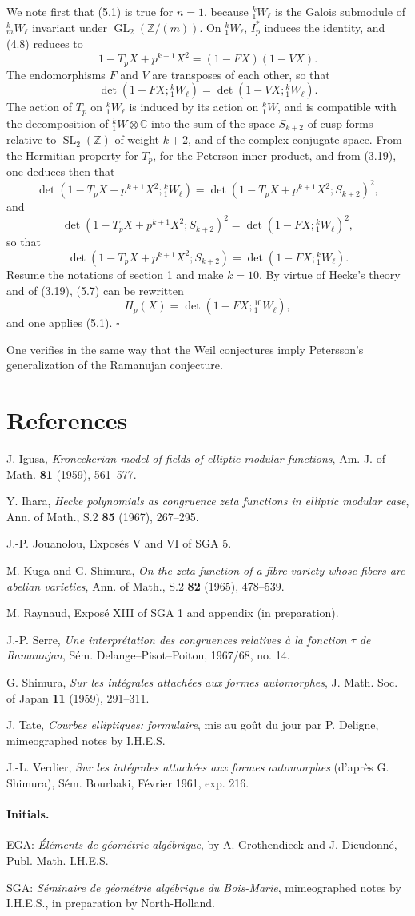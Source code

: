 \documentclass[10pt]{article}
\newcommand{\C}{\mathbb C}
\newcommand{\Z}{\mathbb Z}
\newcommand{\GL}{\operatorname{GL}}
\newcommand{\SL}{\operatorname{SL}}
\newcommand{\QED}{\hfill$\square$}
\begin{document}
We note first that (5.1) is true for $n=1$, because ${}^k_1W_\ell$ is the Galois submodule of ${}^k_mW_\ell$ invariant under $\GL_2(\Z/(m))$. On ${}^k_1W_\ell$, $I_p^*$ induces the identity, and (4.8) reduces to
\[
1-T_pX+p^{k+1}X^2=(1-FX)(1-VX).
\]
The endomorphisms $F$ and $V$ are transposes of each other, so that
\[
\det(1-FX;{}^k_1W_\ell)=\det(1-VX;{}^k_1W_\ell).
\]
The action of $T_p$ on ${}^k_1W_\ell$ is induced by its action on ${}^k_1W$, and is compatible with the decomposition of ${}^k_1W\otimes\C$ into the sum of the space $S_{k+2}$ of cusp forms relative to $\SL_2(\Z)$ of weight $k+2$, and of the complex conjugate space. From the Hermitian property for $T_p$, for the Peterson inner product, and from (3.19), one deduces then that
\[
\det(1-T_pX+p^{k+1}X^2;{}^k_1W_\ell)=\det(1-T_pX+p^{k+1}X^2;S_{k+2})^2,
\]
and
\[
\det(1-T_pX+p^{k+1}X^2;S_{k+2})^2=\det(1-FX;{}^k_1W_\ell)^2,
\]
so that
\[
\det(1-T_pX+p^{k+1}X^2;S_{k+2})=\det(1-FX;{}^k_1W_\ell).
\tag{5.7}
\]
Resume the notations of section 1 and make $k=10$. By virtue of Hecke's theory and of (3.19), (5.7) can be rewritten
\[
H_p(X)=\det(1-FX;{}^{10}_1W_\ell),
\]
and one applies (5.1). \QED

One verifies in the same way that the Weil conjectures imply Petersson's generalization of the Ramanujan conjecture.

\section*{References}
\begin{enumerate}[label={[\arabic*]},leftmargin=2.6em]
\item J. Igusa, \emph{Kroneckerian model of fields of elliptic modular functions}, Am. J. of Math. \textbf{81} (1959), 561--577.
\item Y. Ihara, \emph{Hecke polynomials as congruence zeta functions in elliptic modular case}, Ann. of Math., S.2 \textbf{85} (1967), 267--295.
\item J.-P. Jouanolou, Exposés V and VI of SGA 5.
\item M. Kuga and G. Shimura, \emph{On the zeta function of a fibre variety whose fibers are abelian varieties}, Ann. of Math., S.2 \textbf{82} (1965), 478--539.
\item M. Raynaud, Exposé XIII of SGA 1 and appendix (in preparation).
\item J.-P. Serre, \emph{Une interprétation des congruences relatives à la fonction $\tau$ de Ramanujan}, Sém. Delange--Pisot--Poitou, 1967/68, no. 14.
\item G. Shimura, \emph{Sur les intégrales attachées aux formes automorphes}, J. Math. Soc. of Japan \textbf{11} (1959), 291--311.
\item J. Tate, \emph{Courbes elliptiques: formulaire}, mis au goût du jour par P. Deligne, mimeographed notes by I.H.E.S.
\item J.-L. Verdier, \emph{Sur les intégrales attachées aux formes automorphes} (d'après G. Shimura), Sém. Bourbaki, Février 1961, exp. 216.
\end{enumerate}

\paragraph{Initials.}
EGA: \emph{Éléments de géométrie algébrique}, by A. Grothendieck and J. Dieudonné, Publ. Math. I.H.E.S.

SGA: \emph{Séminaire de géométrie algébrique du Bois-Marie}, mimeographed notes by I.H.E.S., in preparation by North-Holland.
\end{document}
